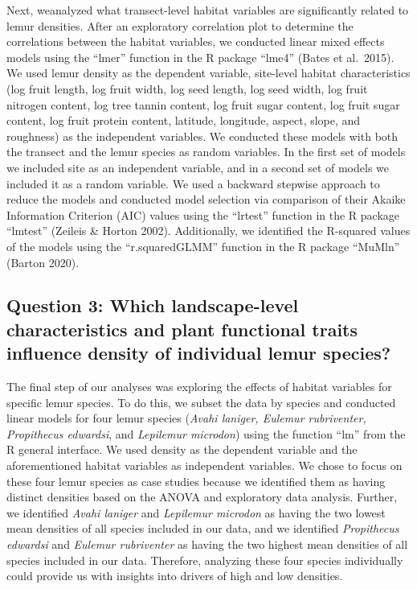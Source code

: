 \documentclass[
  12pt,
]{article}
\begin{document}
Next, weanalyzed what transect-level habitat variables are significantly
related to lemur densities. After an exploratory correlation plot to
determine the correlations between the habitat variables, we conducted
linear mixed effects models using the ``lmer'' function in the R package
``lme4'' (Bates et al.~2015). We used lemur density as the dependent
variable, site-level habitat characteristics (log fruit length, log
fruit width, log seed length, log seed width, log fruit nitrogen
content, log tree tannin content, log fruit sugar content, log fruit
sugar content, log fruit protein content, latitude, longitude, aspect,
slope, and roughness) as the independent variables. We conducted these
models with both the transect and the lemur species as random variables.
In the first set of models we included site as an independent variable,
and in a second set of models we included it as a random variable. We
used a backward stepwise approach to reduce the models and conducted
model selection via comparison of their Akaike Information Criterion
(AIC) values using the ``lrtest'' function in the R package ``lmtest''
(Zeileis \& Horton 2002). Additionally, we identified the R-squared
values of the models using the ``r.squaredGLMM'' function in the R
package ``MuMln'' (Barton 2020).

\hypertarget{question-3-which-landscape-level-characteristics-and-plant-functional-traits-influence-density-of-individual-lemur-species}{%
\subsection{Question 3: Which landscape-level characteristics and plant
functional traits influence density of individual lemur
species?}\label{question-3-which-landscape-level-characteristics-and-plant-functional-traits-influence-density-of-individual-lemur-species}}

The final step of our analyses was exploring the effects of habitat
variables for specific lemur species. To do this, we subset the data by
species and conducted linear models for four lemur species (\emph{Avahi
laniger, Eulemur rubriventer, Propithecus edwardsi}, and \emph{Lepilemur
microdon}) using the function ``lm'' from the R general interface. We
used density as the dependent variable and the aforementioned habitat
variables as independent variables. We chose to focus on these four
lemur species as case studies because we identified them as having
distinct densities based on the ANOVA and exploratory data analysis.
Further, we identified \emph{Avahi laniger} and \emph{Lepilemur
microdon} as having the two lowest mean densities of all species
included in our data, and we identified \emph{Propithecus edwardsi} and
\emph{Eulemur rubriventer} as having the two highest mean densities of
all species included in our data. Therefore, analyzing these four
species individually could provide us with insights into drivers of high
and low densities.
\end{document}
